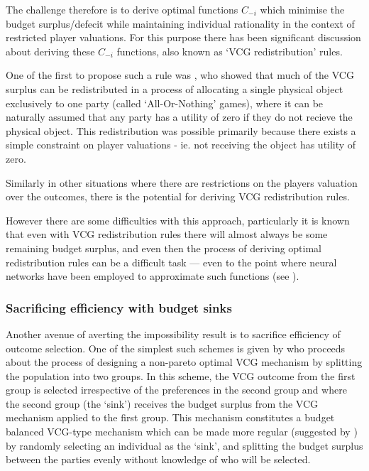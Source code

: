 The challenge therefore is to derive optimal functions $C_{-i}$ which minimise the budget surplus/defecit while maintaining individual rationality in the context of restricted player valuations.
For this purpose there has been significant discussion about deriving these $C_{-i}$ functions, also known as `VCG redistribution' rules.

One of the first to propose such a rule was \cite{Cavallo:2006:ODM:1160633.1160790}, who showed that much of the VCG surplus can be redistributed in a process of allocating a single physical object exclusively to one party (called `All-Or-Nothing' games), where it can be naturally assumed that any party has a utility of zero if they do not recieve the physical object.
This redistribution was possible primarily because there exists a simple constraint on player valuations - ie. not receiving the object has utility of zero.

Similarly in other situations where there are restrictions on the players valuation over the outcomes, there is the potential for deriving VCG redistribution rules.

However there are some difficulties with this approach, particularly it is known that even with VCG redistribution rules there will almost always be some remaining budget surplus, and even then the process of deriving optimal redistribution rules can be a difficult task --- even to the point where neural networks have been employed to approximate such functions (see \cite{DBLP:conf/atal/ManishaJG18}).

\subsubsection{Sacrificing efficiency with budget sinks}

Another avenue of averting the impossibility result is to sacrifice efficiency of outcome selection.
One of the simplest such schemes is given by \cite{Faltings2004b, Boi_faltings_patent}
who proceeds about the process of designing a non-pareto optimal VCG mechanism by splitting the population into two groups.
In this scheme, the VCG outcome from the first group is selected irrespective of the preferences in the second group and where the second group (the `sink') receives the budget surplus from the VCG mechanism applied to the first group.
This mechanism constitutes a budget balanced VCG-type mechanism which can be made more regular (suggested by \cite{10.1007/978-3-642-25510-6_14}) by randomly selecting an individual as the `sink', and splitting the budget surplus between the parties evenly without knowledge of who will be selected.

